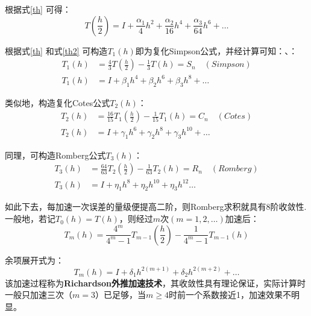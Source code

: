根据式\ref{th} 可得：
\begin{equation}\label{th2}
T(\frac{h}{2}) = I + \frac{\alpha_1}{4}h^2 + \frac{\alpha_2}{16}h^4 + \frac{\alpha_3}{64}h^6 + \dots 
\end{equation}

根据式\ref{th} 和式\ref{th2} 可构造$T_1(h)$即为复化Simpson公式，并经计算可知：、：
\begin{align}
T_1(h) &= \frac{4}{3}T(\frac{h}{2}) - \frac{1}{3}T(h) = S_n\quad (Simpson)\\
T_1(h) &= I + \beta_1 h^4 + \beta_2 h^6 + \beta_3 h^8 +\dots 
\end{align}

类似地，构造复化Cotes公式$T_2(h)$：
\begin{align}
T_2(h) &= \frac{16}{15}T_1(\frac{h}{2}) - \frac{1}{15}T_1(h) = C_n \quad (Cotes)\\
T_2(h) &= I + \gamma_1 h^6 + \gamma_2 h^8 + \gamma_3 h^{10} +\dots 
\end{align}

同理，可构造Romberg公式$T_3(h)$：
\begin{align}
T_3(h) &= \frac{64}{63}T_2(\frac{h}{2}) - \frac{1}{63}T_2(h) = R_n \quad (Romberg)\\
T_3(h) &= I + \eta_1 h^8 + \eta_2 h^{10} + \eta_3 h^{12}\dots 
\end{align}

如此下去，每加速一次误差的量级便提高二阶，则Romberg求积就具有8阶收敛性.一般地，若记$T_0(h) = T(h)$，则经过$m$次$(m=1,2,\dots)$加速后：
\begin{equation}
T_m(h)=\frac{4^m}{4^m - 1}T_{m-1}(\frac{h}{2}) - \frac{1}{4^m -1}T_{m-1}(h)
\end{equation}

余项展开式为：
\begin{equation}
T_m(h)=I + \delta_1 h^{2(m+1)}+\delta_2 h^{2(m+2)} + \dots
\end{equation}
该加速过程称为\textbf{Richardson外推加速技术}，其收敛性具有理论保证，实际计算时一般只加速三次（$m=3$）已足够，当$m\geqslant 4$时前一个系数接近1，加速效果不明显。

\newpage

